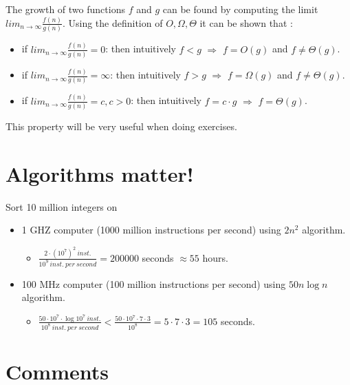 \documentclass[11pt]{article}
\begin{document}
 The growth of two functions $f$ and $g$ can be found by computing the
limit $lim_{n \longrightarrow \infty}\frac{f(n)}{g(n)}$. Using the
definition of $O,\Omega, \Theta$ it can be shown that :
\begin{itemize}

\item if $lim_{n \longrightarrow \infty}\frac{f(n)}{g(n)} = 0 $: then
intuitively $f<g$ $\Longrightarrow$ $f = O(g)$ and $f \neq \Theta (g)$.

\item if  $lim_{n \longrightarrow \infty} \frac{f(n)}{g(n)} = \infty $: then
intuitively $f>g$ $\Longrightarrow$ $f = \Omega(g)$ and $f \neq \Theta (g)$.

\item if  $lim_{n \longrightarrow \infty}\frac{f(n)}{g(n)} = c, c>0$:  then intuitively $f=c \cdot g$ $\Longrightarrow$ $f = \Theta(g)$.
\end{itemize}
This property will be very useful when doing exercises.



\newpage
\section{Algorithms matter!}

Sort 10 million integers on 
\begin{itemize}
\item 1 GHZ computer (1000 million instructions per second) using $2n^2$
algorithm.
    \begin{itemize} 
    \item $\frac{2\cdot(10^7)^2~inst.}{10^9~inst.~per~second} =
    200000$ seconds $\approx 55$ hours.  
    \end{itemize}

\item 100 MHz computer (100 million instructions per second)
using $50n\log n $ algorithm.
\begin{itemize} 
\item $\frac{50\cdot10^7\cdot \log 10^7~inst.}{10^8~ inst.~per~second}
< \frac{50\cdot10^7\cdot 7\cdot 3}{10^8} = 5\cdot 7\cdot 3 = 105$
seconds.
\end{itemize}



\end{itemize}



\section{Comments}
\end{document}
